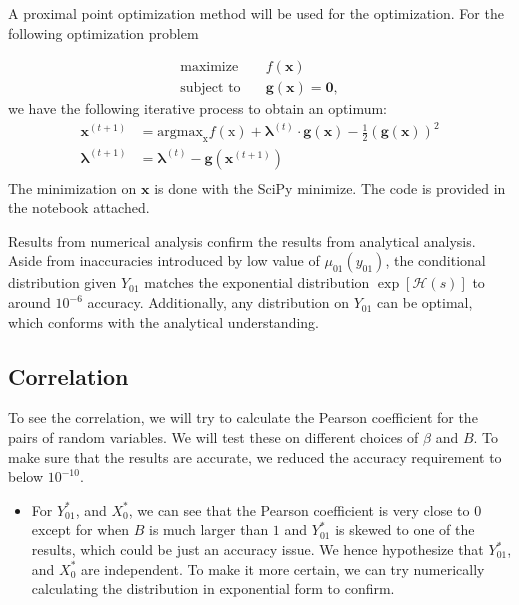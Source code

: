 \documentclass[12pt]{article}
\begin{document}
A proximal point optimization method will be used for the optimization. For the following optimization problem

$$\begin{aligned}
        \text{maximize}\quad   & f(\textbf{x})                        \\
        \text{subject to}\quad & \textbf{g}(\textbf{x}) = \textbf{0},
    \end{aligned}$$
we have the following iterative process to obtain an optimum:
$$\begin{aligned}
        \textbf{x}^{(t+1)}       & = \text{argmax}_{\text{x}} f(\text{x}) + \mathbf{\lambda}^{(t)} \cdot \textbf{g}(\textbf{x}) - \frac12 (\textbf{g}(\textbf{x}))^2 \\
        \mathbf{\lambda}^{(t+1)} & = \mathbf{\lambda}^{(t)} - \textbf{g}\left(\textbf{x}^{(t+1)}\right)                                                              \\
    \end{aligned}$$
The minimization on $\textbf{x}$ is done with the SciPy minimize. The code is provided in the notebook attached.

Results from numerical analysis confirm the results from analytical analysis. Aside from inaccuracies introduced by low value of $\mu_{01}(y_{01})$,
the conditional distribution given $Y_{01}$ matches the exponential distribution $\exp[\mathcal{H}(s)]$ to around $10^{-6}$ accuracy. Additionally,
any distribution on $Y_{01}$ can be optimal, which conforms with the analytical understanding.

\subsection{Correlation}

To see the correlation, we will try to calculate the Pearson coefficient for the pairs of random variables. We will test these on different choices of $\beta$ and $B$. To make sure that the results are accurate, we reduced the accuracy requirement to below $10^{-10}$.

\begin{itemize}
    \item For $Y^*_{01}$, and $X^*_{0}$, we can see that the Pearson coefficient is very close to $0$ except for when $B$ is much larger than $1$ and $Y^*_{01}$
          is skewed to one of the results, which could be just an accuracy issue. We hence hypothesize that $Y^*_{01}$, and $X^*_{0}$ are independent.
          To make it more certain, we can try numerically calculating the distribution in exponential form to confirm.
\end{itemize}
\end{document}
